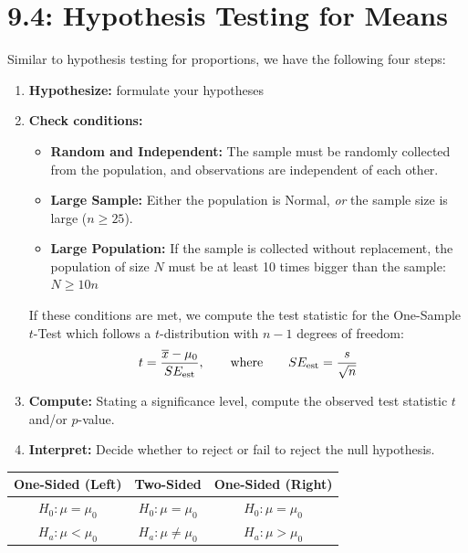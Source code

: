 \documentclass[../mathNotesPreamble]{subfiles}
\providecommand{\relscalefact}{1.4}
\begin{document}
\relscale{\relscalefact}
  \section{9.4: Hypothesis Testing for Means}
  Similar to hypothesis testing for proportions, we have the following four steps:
  \vspace*{0.5\baselineskip}

  \begin{thmBox*}
    \begin{enumerate}
      \item \textbf{Hypothesize:} formulate your hypotheses
      \item \textbf{Check conditions:}
        \begin{itemize}
          \item \textbf{Random and Independent:} The sample must be randomly collected from the population, and observations are independent of each other.
          \item \textbf{Large Sample:} Either the population is Normal, \emph{or} the sample size is large ($n\geq 25$).
          \item \textbf{Large Population:} If the sample is collected without replacement, the population of size $N$ must be at least 10 times bigger than the sample: $N\geq 10 n$
        \end{itemize}
        If these conditions are met, we compute the test statistic for the One-Sample $t$-Test which follows a $t$-distribution with ${n-1}$ degrees of freedom:
          \[t=\frac{\overline{x}-\mu_0}{SE_{\textnormal{est}}}, \qquad \textnormal{where} \qquad SE_{\textnormal{est}}=\frac{s}{\sqrt{n}}\]
      \item \textbf{Compute:} Stating a significance level, compute the observed test statistic $t$ and/or $p$-value.
      \item \textbf{Interpret:} Decide whether to reject or fail to reject the null hypothesis.
    \end{enumerate}
  \end{thmBox*}
  \pagebreak

  \begin{center}
    \begin{tabular}{@{}ccc@{}}\toprule
      One-Sided (Left)& Two-Sided& One-Sided (Right)\\\midrule
      $H_0: \mu=\mu_0$& $H_0: \mu=\mu_0$& $H_0: \mu=\mu_0$\\
      $H_a: \mu<\mu_0$& $H_a: \mu\neq \mu_0$& $H_a: \mu> \mu_0$\\\bottomrule
    \end{tabular}
  \end{center}
  \vspace*{\baselineskip}
\end{document}
